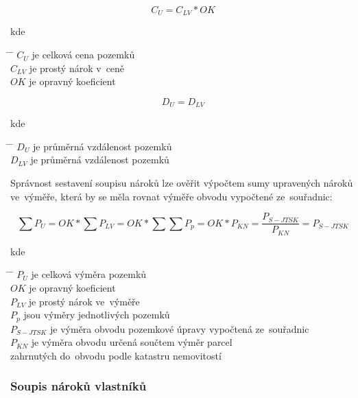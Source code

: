 \begin{equation} C_{U} = C_{LV}*OK
\end{equation}

kde
\begin{tabbing} \hspace{2em} \= \hspace{5em} \= \kill \> $C_{U}$ \> je
celková cena pozemků \\ \> $C_{LV}$ \> je prostý nárok v~ceně \\ \>
$OK$ \> je opravný koeficient
\end{tabbing}

\begin{equation} D_{U} = D_{LV}
\end{equation}

kde
\begin{tabbing} \hspace{2em} \= \hspace{5em} \= \kill \> $D_{U}$ \> je
průměrná vzdálenost pozemků \\ \> $D_{LV}$ \> je průměrná vzdálenost
pozemků
\end{tabbing}

Správnost sestavení soupisu nároků lze ověřit výpočtem sumy upravených
nároků ve~výměře, která by se měla rovnat výměře obvodu 
vypočtené ze~souřadnic:

\begin{equation} \sum\nolimits P_{U} = OK*\sum\nolimits P_{LV} = OK *
\sum\nolimits \sum\nolimits P_{p} = OK*P_{KN} =
\frac{P_{S-JTSK}}{P_{KN}} = P_{S-JTSK}
\end{equation}

kde
\begin{tabbing} \hspace{2em} \= \hspace{5em} \= \kill \> $P_{U}$ \> je
celková výměra pozemků \\ \> $OK$ \> je opravný koeficient \\ \>
$P_{LV}$ \> je prostý nárok ve~výměře \\ \> $P_{p}$ \> jsou výměry
jednotlivých pozemků \\ \> $P_{S-JTSK}$ \> je výměra obvodu pozemkové
úpravy vypočtená ze~souřadnic \\ \> $P_{KN}$ \> je výměra obvodu
určená součtem výměr parcel \\ \> \> zahrnutých do~obvodu podle
katastru nemovitostí
\end{tabbing}

\subsubsection{Soupis nároků vlastníků}
\label{soupis_naroku_vlastniku}

